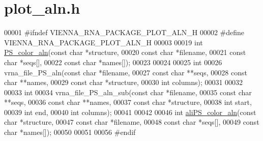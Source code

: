 \hypertarget{plot__aln_8h_source}{}\section{plot\+\_\+aln.\+h}
\label{plot__aln_8h_source}

\begin{DoxyCode}
00001 \textcolor{preprocessor}{#ifndef VIENNA\_RNA\_PACKAGE\_PLOT\_ALN\_H}
00002 \textcolor{preprocessor}{#define VIENNA\_RNA\_PACKAGE\_PLOT\_ALN\_H}
00003 
00019 \textcolor{keywordtype}{int} \hyperlink{group__plotting__utils_ga821802c3685e37e15182341f6217470d}{PS\_color\_aln}(\textcolor{keyword}{const} \textcolor{keywordtype}{char} *structure,
00020                  \textcolor{keyword}{const} \textcolor{keywordtype}{char} *filename,
00021                  \textcolor{keyword}{const} \textcolor{keywordtype}{char} *seqs[],
00022                  \textcolor{keyword}{const} \textcolor{keywordtype}{char} *names[]);
00023 
00024 
00025 \textcolor{keywordtype}{int}
00026 vrna\_file\_PS\_aln(\textcolor{keyword}{const} \textcolor{keywordtype}{char} *filename,
00027                  \textcolor{keyword}{const} \textcolor{keywordtype}{char} **seqs,
00028                  \textcolor{keyword}{const} \textcolor{keywordtype}{char} **names,
00029                  \textcolor{keyword}{const} \textcolor{keywordtype}{char} *structure,
00030                  \textcolor{keywordtype}{int}        columns);
00031 
00032 
00033 \textcolor{keywordtype}{int}
00034 vrna\_file\_PS\_aln\_sub(\textcolor{keyword}{const} \textcolor{keywordtype}{char} *filename,
00035                      \textcolor{keyword}{const} \textcolor{keywordtype}{char} **seqs,
00036                      \textcolor{keyword}{const} \textcolor{keywordtype}{char} **names,
00037                      \textcolor{keyword}{const} \textcolor{keywordtype}{char} *structure,
00038                      \textcolor{keywordtype}{int}        start,
00039                      \textcolor{keywordtype}{int}        end,
00040                      \textcolor{keywordtype}{int}        columns);
00041 
00042 
00046 \textcolor{keywordtype}{int} \hyperlink{group__plotting__utils_gaab48d4dac655d688abe921389ac2847c}{aliPS\_color\_aln}(\textcolor{keyword}{const} \textcolor{keywordtype}{char}  *structure,
00047                     \textcolor{keyword}{const} \textcolor{keywordtype}{char}  *filename,
00048                     \textcolor{keyword}{const} \textcolor{keywordtype}{char}  *seqs[],
00049                     \textcolor{keyword}{const} \textcolor{keywordtype}{char}  *names[]);
00050 
00051 
00056 \textcolor{preprocessor}{#endif}
\end{DoxyCode}
